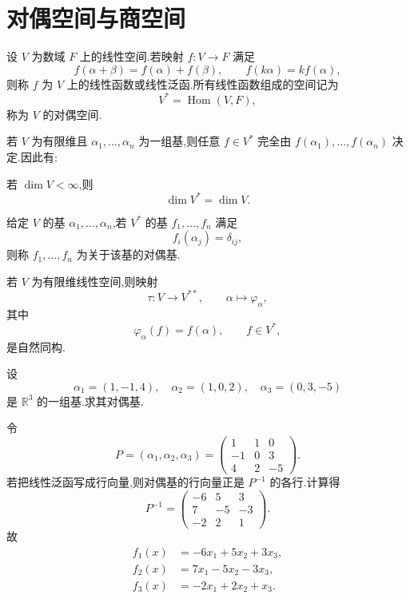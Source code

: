 \newpage

\section{对偶空间与商空间}

\begin{definition}
设 $V$ 为数域 $F$ 上的线性空间.若映射 $f:V\to F$ 满足
\[
f(\alpha+\beta)=f(\alpha)+f(\beta),
\qquad
f(k\alpha)=kf(\alpha),
\]
则称 $f$ 为 $V$ 上的线性函数或线性泛函.所有线性函数组成的空间记为
\[
V^*=\operatorname{Hom}(V,F),
\]
称为 $V$ 的对偶空间.
\end{definition}

若 $V$ 为有限维且 $\alpha_1,\ldots,\alpha_n$ 为一组基,则任意 $f\in V^*$ 完全由 $f(\alpha_1),\ldots,f(\alpha_n)$ 决定.因此有:

\begin{proposition}[\markstar]
若 $\dim V<\infty$,则
\[
\dim V^*=\dim V.
\]
\end{proposition}

\begin{definition}
给定 $V$ 的基 $\alpha_1,\ldots,\alpha_n$,若 $V^*$ 的基 $f_1,\ldots,f_n$ 满足
\[
f_i(\alpha_j)=\delta_{ij},
\]
则称 $f_1,\ldots,f_n$ 为关于该基的对偶基.
\end{definition}

\begin{theorem}
若 $V$ 为有限维线性空间,则映射
\[
\tau:V\to V^{**},
\qquad
\alpha\longmapsto\varphi_\alpha,
\]
其中
\[
\varphi_\alpha(f)=f(\alpha),
\qquad f\in V^*,
\]
是自然同构.
\end{theorem}

\begin{example}
设
\[
\alpha_1=(1,-1,4),\quad
\alpha_2=(1,0,2),\quad
\alpha_3=(0,3,-5)
\]
是 $\mathbb{R}^3$ 的一组基.求其对偶基.
\end{example}
\exampleblank

\begin{solution}
令
\[
P=(\alpha_1,\alpha_2,\alpha_3)
=
\begin{pmatrix}
1&1&0\\
-1&0&3\\
4&2&-5
\end{pmatrix}.
\]
若把线性泛函写成行向量,则对偶基的行向量正是 $P^{-1}$ 的各行.计算得
\[
P^{-1}=
\begin{pmatrix}
-6&5&3\\
7&-5&-3\\
-2&2&1
\end{pmatrix}.
\]
故
\[
\boxed{
\begin{aligned}
f_1(x)&=-6x_1+5x_2+3x_3,\\
f_2(x)&=7x_1-5x_2-3x_3,\\
f_3(x)&=-2x_1+2x_2+x_3.
\end{aligned}}
\]
\end{solution}

